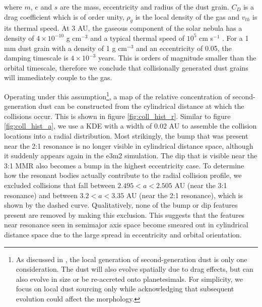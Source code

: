 \documentclass[twocolumn]{aastex63}
\begin{document}
\noindent where $m$, $e$ and $s$ are the mass, eccentricity and radius of the dust grain. $C_{D}$ is a drag coefficient which is of order unity, $
\rho_{g}$ is the local density of the gas and $v_{th}$ is its thermal speed. At 3 AU, the gaseous component of the solar nebula has a density of $4 
\times 10^{-10}$ g cm$^{-3}$ and a typical thermal speed of $10^{5}$ cm s$^{-1}$ \citep{1981PThPS..70...35H}. For a 1 mm dust grain with a 
density of 1 g cm$^{-3}$ and an eccentricity of 0.05, the damping timescale is $4 \times 10^{-3}$ years. This is orders of magnitude smaller than the 
orbital timescale, therefore we conclude that collisionally generated dust grains will immediately couple to the gas.

Operating under this assumption\footnote{As discussed in \cite{2017ApJ...850..103B}, the local generation of second-generation dust is only one 
consideration.  The dust will also evolve spatially due to drag effects, but can also evolve in size or be re-accreted onto planetesimals. For simplicity, 
we focus on local dust sourcing only while acknowledging that subsequent evolution could affect the morphology.}, a map of the relative concentration 
of second-generation dust can be constructed from the cylindrical distance at which the collisions occur. This is shown in figure \ref{fig:coll_hist_r}. 
Similar to figure \ref{fig:coll_hist_a}, we use a KDE with a width of 0.02 AU to assemble the collision locations into a radial distribution. Most 
strikingly, the bump that was present near the 2:1 resonance is no longer visible in cylindrical distance space, although it suddenly appears again in 
the e3m2 simulation. The dip that is visible near the 3:1 MMR also becomes a bump in the highest eccentricity case. To determine how the resonant 
bodies actually contribute to the radial collision profile, we excluded collisions that fall between $2.495 < a < 2.505$ AU (near the 3:1 resonance) and 
between $3.2 < a < 3.35$ AU (near the 2:1 resonance), which is shown by the dashed curve. Qualitatively, none of the bump or dip features present 
are removed by making this exclusion. This suggests that the features near resonance seen in semimajor axis space become smeared out in 
cylindrical distance space due to the large spread in eccentricity and orbital orientation.
\end{document}
